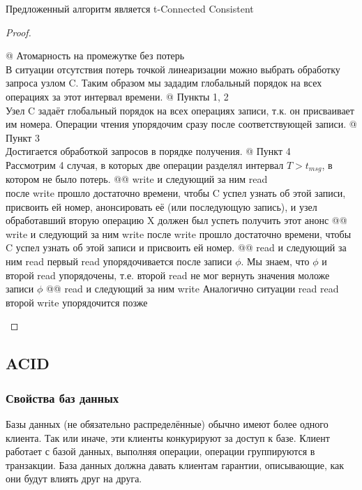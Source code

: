 \begin{thm}
Предложенный алгоритм является t-Connected Consistent
\end{thm}
\begin{proof}
\begin{el}[ul]
@ Атомарность на промежутке без потерь \\
В ситуации отсутствия потерь точкой линеаризации можно выбрать обработку запроса узлом C. Таким образом мы зададим глобальный порядок на всех операциях за этот интервал времени.
@ Пункты 1, 2 \\
Узел C задаёт глобальный порядок на всех операциях записи, т.к. он
присваивает им номера. Операции чтения упорядочим сразу после
соответствующей записи.
@ Пункт 3 \\
Достигается обработкой запросов в порядке получения.
@ Пункт 4 \\
Рассмотрим 4 случая, в которых две операции разделял интервал $T > t_{msg}$, в котором не было потерь.
@@ write и следующий за ним read\\
после write прошло достаточно времени, чтобы C успел узнать об этой записи, присвоить ей номер, анонсировать её (или последующую запись), и узел обработавший вторую операцию X должен был успеть получить этот анонс
@@ write и следующий за ним write
после write прошло достаточно времени, чтобы C успел узнать об этой записи и присвоить ей номер.
@@ read и следующий за ним read
первый read упорядочивается после записи $\phi$. Мы знаем, что $\phi$ и второй read упорядочены, т.е. второй read не мог вернуть значения моложе записи $\phi$
@@ read и следующий за ним write
Аналогично ситуации read read второй write упорядочится позже
\end{el}
\end{proof}

\subsection{ACID}


\subsubsection{Свойства баз данных}
Базы данных (не обязательно распределённые) обычно имеют более одного клиента. Так или иначе, эти клиенты конкурируют за доступ к базе.
Клиент работает с базой данных, выполняя операции, операции группируются в транзакции. База данных должна давать клиентам гарантии, описывающие, как они будут влиять друг на друга.


